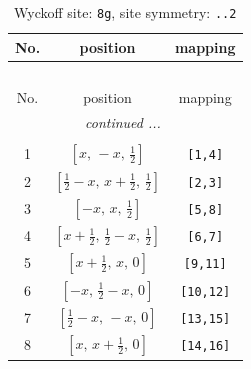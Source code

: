 \documentclass[fleqn,8pt]{jsarticle}
\begin{document}
\renewcommand{\arraystretch}{1.2}
\begin{longtable}{ccc}
\caption{Wyckoff site: {\tt 8g}, site symmetry: {\tt ..2}}
 \\
 \hline \hline
No. & position & mapping \\ \hline \endfirsthead

\multicolumn{2}{l}{\tablename\ \thetable{}} \\
 \hline \hline
No. & position & mapping \\ \hline \endhead

 \hline \hline
\multicolumn{2}{r}{\footnotesize\it continued ...} \\ \endfoot

 \hline \hline
\multicolumn{2}{r}{} \\ \endlastfoot

1 & $\left[ x,\, - x,\, \frac{1}{2} \right]$ & {\tt [1,4]} \\ \hline
2 & $\left[ \frac{1}{2} - x,\, x + \frac{1}{2},\, \frac{1}{2} \right]$ & {\tt [2,3]} \\ \hline
3 & $\left[ - x,\, x,\, \frac{1}{2} \right]$ & {\tt [5,8]} \\ \hline
4 & $\left[ x + \frac{1}{2},\, \frac{1}{2} - x,\, \frac{1}{2} \right]$ & {\tt [6,7]} \\ \hline
5 & $\left[ x + \frac{1}{2},\, x,\, 0 \right]$ & {\tt [9,11]} \\ \hline
6 & $\left[ - x,\, \frac{1}{2} - x,\, 0 \right]$ & {\tt [10,12]} \\ \hline
7 & $\left[ \frac{1}{2} - x,\, - x,\, 0 \right]$ & {\tt [13,15]} \\ \hline
8 & $\left[ x,\, x + \frac{1}{2},\, 0 \right]$ & {\tt [14,16]} \\
\end{longtable}
\renewcommand{\arraystretch}{1.2}
\end{document}
